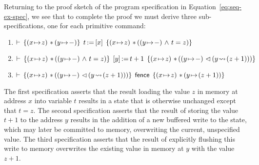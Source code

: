 \documentclass[11pt]{report}
\begin{document}
Returning to the proof sketch of the program specification in Equation~\ref{eq:seq-ex-spec}, we see that to complete the proof we must derive three sub-specifications, one for each primitive command: \begin{enumerate}
  \item $\triple{(x \fpointsto z) \fsep (y \fpointsto -)}{\cload{t}{x}}{(x \fpointsto z) \fsep ((y \fpointsto -) \conj t = z)}$
  \item $\triple{(x \fpointsto z) \fsep ((y \fpointsto -) \conj t = z)}{\cstore{y}{t+1}}{(x \fpointsto z) \fsep ((y \fpointsto -) \fseq (y \fwriteu (z+1)))}$
  \item $\triple{(x \fpointsto z) \fsep ((y \fpointsto -) \fseq (y \fwriteu (z+1)))}{\cfence}{(x \fpointsto z) \fsep (y \fpointsto (z+1))}$
\end{enumerate}
The first specification asserts that the result loading the value $z$ in memory at address $x$ into variable $t$ results in a state that is otherwise unchanged except that $t = z$. The second specification asserts that the result of storing the value $t+1$ to the address $y$ results in the addition of a new buffered write to the state, which may later be committed to memory, overwriting the current, unspecified value. The third specification asserts that the result of explicitly flushing this write to memory overwrites the existing value in memory at $y$ with the value $z+1$. 
\end{document}
